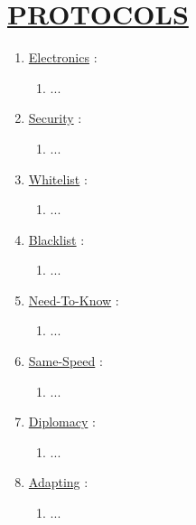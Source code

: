 \documentclass[11pt]{article}
\begin{document}
\section*{\ul{PROTOCOLS}}
\begin{enumerate}
	\item[] \ul{Electronics} :
	\begin{enumerate}
		\item[] ...
	\end{enumerate}

	\item[] \ul{Security} :
	\begin{enumerate}
		\item[] ...
	\end{enumerate}

	\item[] \ul{Whitelist} :
	\begin{enumerate}
		\item[] ...
	\end{enumerate}
	
	\item[] \ul{Blacklist} :
	\begin{enumerate}
		\item[] ...
	\end{enumerate}

	\item[] \ul{Need-To-Know} :
	\begin{enumerate}
		\item[] ...
	\end{enumerate}

	\item[] \ul{Same-Speed} :
	\begin{enumerate}
		\item[] ...
	\end{enumerate}

	\item[] \ul{Diplomacy}  :
	\begin{enumerate}
		\item[] ...
	\end{enumerate}

	\item[] \ul{Adapting} :
	\begin{enumerate}
		\item[] ...
	\end{enumerate}
\end{enumerate}
\end{document}
